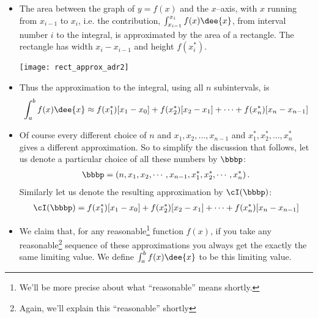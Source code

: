 \begin{itemize}
\item The area between the graph of $y=f(x)$ and the $x$--axis, with $x$ running
from $x_{i-1}$ to $x_i$, i.e. the contribution,
$\int_{x_{i-1}}^{x_i} f(x)\dee{x}$, from interval number $i$ to the integral,
is approximated by the area of a rectangle. The rectangle has width
$x_i-x_{i-1}$ and height $f(x_i^*)$.
\begin{efig}
\begin{center}
      \texttt{[image: rect\_approx\_adr2]}
\end{center}
\end{efig}
\item Thus the approximation to the integral, using all $n$ subintervals, is
\begin{align*}
\int_a^b f(x)\dee{x}
\approx f(x_1^*)[x_1-x_0]+f(x_2^*)[x_2-x_1]+\cdots+ f(x_n^*)[x_n-x_{n-1}]
\end{align*}
\item Of course every different choice of $n$ and $x_1,x_2,\dots,x_{n-1}$
and $x_1^*, x_2^*,\dots,x_n^*$ gives a different approximation. So to
simplify the
discussion that follows, let us denote a particular choice of all these numbers
by $\bbbp$:
\begin{align*}
\bbbp=\left(n,x_1,x_2,\cdots,x_{n-1},x_1^*, x_2^*, \cdots, x_n^*\right).
\end{align*}
Similarly let us denote the resulting approximation by $\cI(\bbbp)$:
\begin{align*}
\cI(\bbbp)=f(x_1^*)[x_1-x_0]+f(x_2^*)[x_2-x_1]+\cdots+ f(x_n^*)[x_n-x_{n-1}]
\end{align*}

\item We claim that, for any reasonable\footnote{We'll be more precise about
what ``reasonable'' means shortly.} function $f(x)$, if you take any
reasonable\footnote{Again, we'll explain this ``reasonable'' shortly} sequence
of
these
approximations you always get the exactly the same limiting value. We define
$\int_a^b f(x) \dee{x}$ to be this limiting value.


\end{itemize}
